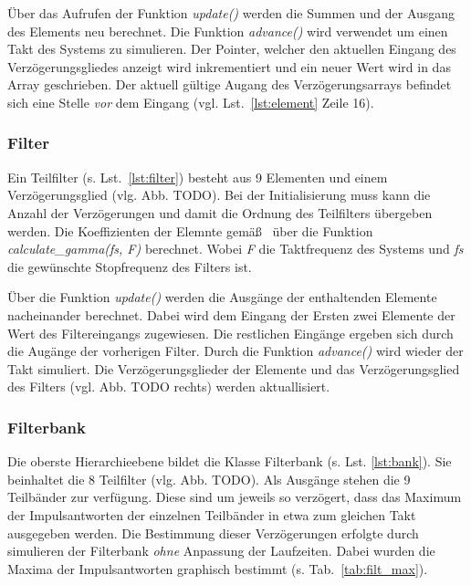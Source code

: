 Über das Aufrufen der Funktion \emph{update()} werden die Summen und der Ausgang des Elements neu berechnet. Die Funktion \emph{advance()} wird verwendet um einen Takt des Systems zu simulieren. Der Pointer, welcher den aktuellen Eingang des Verzögerungsgliedes anzeigt wird inkrementiert und ein neuer Wert wird in das Array geschrieben. Der aktuell gültige Augang des Verzögerungsarrays befindet sich eine Stelle \emph{vor} dem Eingang (vgl. Lst.~\ref{lst:element} Zeile 16).




\subsubsection{Filter}\label{sec:impl_Filter}
Ein Teilfilter (s. Lst.~\ref{lst:filter}) besteht aus 9 Elementen und einem Verzögerungsglied (vlg. Abb. TODO). Bei der Initialisierung muss kann die Anzahl der Verzögerungen und damit die Ordnung des Teilfilters übergeben werden. Die Koeffizienten der Elemnte gemäß~\cite{gaszi1983} über die Funktion \emph{calculate\_gamma(fs, F)} berechnet. Wobei \emph{F} die Taktfrequenz des Systems und \emph{fs} die gewünschte Stopfrequenz des Filters ist.

Über die Funktion \emph{update()} werden die Ausgänge der enthaltenden Elemente nacheinander berechnet. Dabei wird dem Eingang der Ersten zwei Elemente der Wert des Filtereingangs zugewiesen. Die restlichen Eingänge ergeben sich durch die Augänge der vorherigen Filter. Durch die Funktion \emph{advance()} wird wieder der Takt simuliert. Die Verzögerungsglieder der Elemente und das Verzögerungsglied des Filters (vgl. Abb. TODO rechts) werden aktuallisiert.



\subsubsection{Filterbank}\label{sec:impl_bank}
Die oberste Hierarchieebene bildet die Klasse Filterbank (s. Lst. \ref{lst:bank}). Sie beinhaltet die 8 Teilfilter (vlg. Abb. TODO). Als Ausgänge stehen die 9 Teilbänder zur verfügung. Diese sind um jeweils so verzögert, dass das Maximum der Impulsantworten der einzelnen Teilbänder in etwa zum gleichen Takt ausgegeben werden. Die Bestimmung dieser Verzögerungen erfolgte durch simulieren der Filterbank \emph{ohne} Anpassung der Laufzeiten. Dabei wurden die Maxima der Impulsantworten graphisch bestimmt (s. Tab.~\ref{tab:filt_max}).

